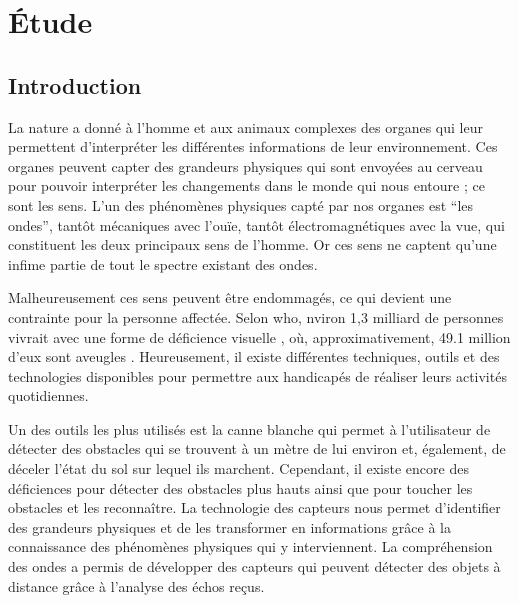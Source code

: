 \chapter{Étude}


\section{Introduction}

\indent La nature a donné à l’homme et aux animaux complexes des organes qui leur permettent d’interpréter les différentes informations de leur environnement. Ces organes peuvent capter des grandeurs physiques qui sont envoyées au cerveau pour pouvoir interpréter les changements dans le monde qui nous entoure ; ce sont les sens. L’un des phénomènes physiques capté par nos organes est “les ondes”, tantôt mécaniques avec l’ouïe, tantôt électromagnétiques avec la vue, qui constituent les deux principaux sens de l’homme. Or ces sens ne captent qu’une infime partie de tout le spectre existant des ondes.


Malheureusement ces sens peuvent être endommagés, ce qui devient une contrainte pour la personne affectée. Selon \acrfull{who}, nviron 1,3 milliard de personnes vivrait avec une forme de déficience visuelle \cite{WHO-blindness-and-visual-impairment}, où, approximativement, 49.1 million d'eux sont aveugles \cite{number-of-blind}. Heureusement, il existe différentes techniques, outils et des technologies disponibles pour permettre aux handicapés de réaliser leurs activités quotidiennes.


Un des outils les plus utilisés est la canne blanche qui permet à l’utilisateur de détecter des obstacles qui se trouvent à un mètre de lui environ et, également, de déceler l’état du sol sur lequel ils marchent. Cependant, il existe encore des déficiences pour détecter des obstacles plus hauts ainsi que pour toucher les obstacles et les reconnaître. La technologie des capteurs nous permet d’identifier des grandeurs physiques et de les transformer en informations grâce à la connaissance des phénomènes physiques qui y interviennent. La compréhension des ondes a permis de développer des capteurs qui peuvent détecter des objets à distance grâce à l’analyse des échos reçus.

